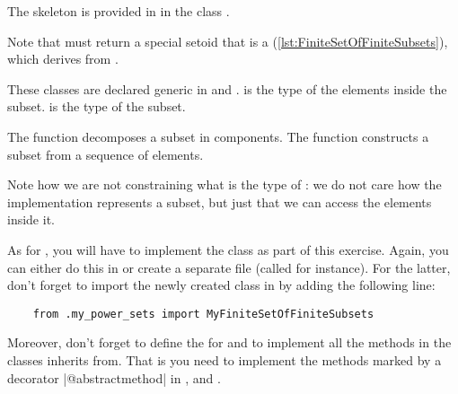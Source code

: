 \label{sec:power-set-exercise}


The skeleton is provided in  in the class .


Note that  must return a special setoid that is a  (\cref{lst:FiniteSetOfFiniteSubsets}), which derives from .


These classes are declared generic in  and .
 is the type of the elements inside the subset.
 is the type of the subset.

The function  decomposes a subset in components.
The function  constructs a subset from a sequence of elements.

Note how we are not constraining what is the type of : we do not care how the implementation represents a subset, but just that we can access the elements inside it.

As for \FiniteSet, you will have to implement the class  as part of this exercise.
Again, you can either do this in  or create a separate file (called  for instance).
For the latter, don't forget to import the newly created class in  by adding the following line:
\begin{verbatim}
    from .my_power_sets import MyFiniteSetOfFiniteSubsets
\end{verbatim}
Moreover, don't forget to define the  for  and to implement all the methods in the classes  inherits from.
That is you need to implement the methods marked by a decorator \pystr|@abstractmethod| in ,  and .
